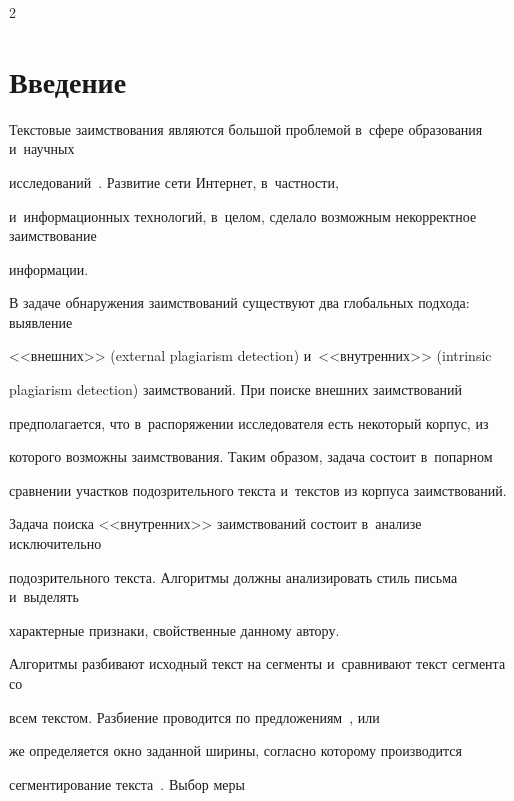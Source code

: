 \begin{multicols}{2}



\label{st\stat}







\section{Введение}



Текстовые заимствования являются большой проблемой в~сфере образования и~научных 

исследований~\cite{Stud_plag}. Развитие сети Интернет, в~част\-ности,

и~информационных технологий, в~целом, сделало возможным некорректное заимствование 

информации.



В задаче обнаружения заимствований существуют два глобальных подхода: выявление 

<<внешних>> (external plagiarism detection) и~<<внутренних>> (intrinsic 

plagiarism detection) заимствований. При поиске внешних заимствований 

предполагается, что в~распоряжении исследователя есть некоторый корпус, из 

которого возможны заимствования. Таким образом, задача состоит в~попарном 

сравнении участков подозрительного текста и~текстов из корпуса заимствований.



Задача поиска <<внутренних>> заимствований состоит в~анализе исключительно 

подозрительного текста. Алгоритмы должны анализировать стиль письма и~выделять 

характерные признаки, свойственные данному автору.



Алгоритмы разбивают исходный текст на сегменты и~сравнивают текст сегмента со 

всем текстом. Разбиение проводится по предложениям~\cite{Graz, Innsbruck}, или 

же определяется окно заданной ширины, согласно которому производится 

сегментирование текс\-та~\cite{Aegean, Weimar, Chile, Valencia}. Выбор меры 


\end{multicols}
